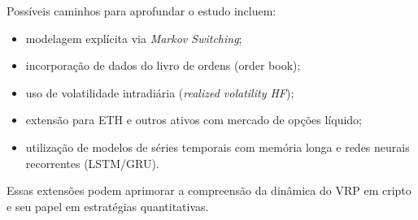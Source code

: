 Possíveis caminhos para aprofundar o estudo incluem:

\begin{itemize}
    \item modelagem explícita via \textit{Markov Switching};
    \item incorporação de dados do livro de ordens (order book);
    \item uso de volatilidade intradiária (\textit{realized volatility HF});
    \item extensão para ETH e outros ativos com mercado de opções líquido;
    \item utilização de modelos de séries temporais com memória longa e redes
          neurais recorrentes (LSTM/GRU).
\end{itemize}

Essas extensões podem aprimorar a compreensão da dinâmica do VRP em cripto e
seu papel em estratégias quantitativas.

\appendix
